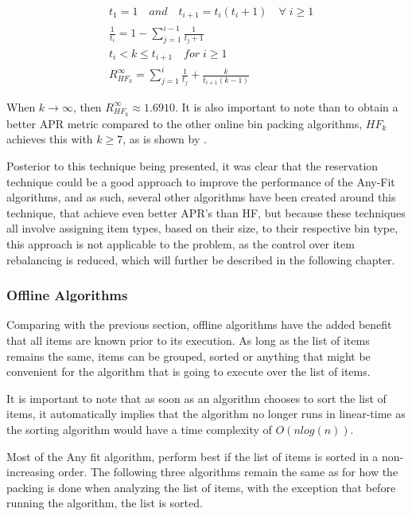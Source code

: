 \begin{align}
    & t_1 = 1 \quad and \quad t_{i+1} = t_i(t_i + 1) \quad \forall \; i \geq 1 \\
    & \frac{1}{t_i} = 1 - \sum_{j=1}^{i-1} \frac{1}{t_j + 1} \\
    & t_i < k \leq t_{i+1} \quad for \; i \geq 1 \\
    & R_{HF_k}^\infty = \sum_{j=1}^{i} \frac{1}{t_j} + \frac{k}{t_{i+1}(k-1)}
\end{align}

When $k \to \infty$, then $R_{HF_k}^\infty \approx 1.6910$. It is also important to note than to obtain a better APR metric compared to the other online bin packing algorithms, $HF_k$ achieves this with $k \geq 7$, as is shown by \cite{lee1985simple}.

Posterior to this technique being presented, it was clear that the reservation technique could be a good approach to improve the performance of the Any-Fit algorithms, and as such, several other algorithms have been created around this technique, that achieve even better APR's than HF, but because these techniques all involve assigning item types, based on their size, to their respective bin type, this approach is not applicable to the problem, as the control over item rebalancing is reduced, which will further be described in the following chapter.



\subsubsection{Offline Algorithms}

Comparing with the previous section, offline algorithms have the added benefit that all items are known prior to its execution. As long as the list of items remains the same, items can be grouped, sorted or anything that might be convenient for the algorithm that is going to execute over the list of items. 

It is important to note that as soon as an algorithm chooses to sort the list of items, it automatically implies that the algorithm no longer runs in linear-time as the sorting algorithm would have a time complexity of $O(n log(n))$.

Most of the Any fit algorithm, perform best if the list of items is sorted in a non-increasing order. The following three algorithms remain the same as for how the packing is done when analyzing the list of items, with the exception that before running the algorithm, the list is sorted.

